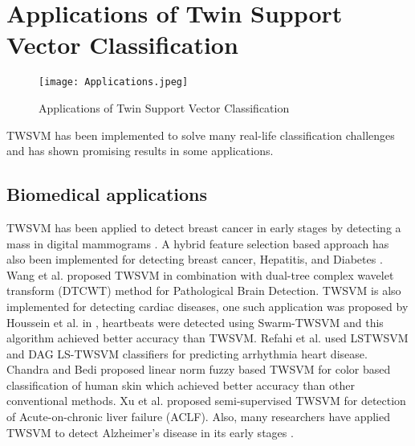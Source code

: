 \documentclass[pdflatex,sn-mathphys]{sn-jnl}%
\theoremstyle{thmstyleone}%
\theoremstyle{thmstyletwo}%
\theoremstyle{thmstylethree}%
\begin{document}
\section{Applications of Twin Support Vector Classification}
\label{sec:Applications of Twin Support Vector Classification}
\begin{figure}
    \centering
    \texttt{[image: Applications.jpeg]}
    \caption{Applications of Twin Support Vector Classification}
    \label{fig:Applications of Twin Support Vector Classification}
\end{figure}
TWSVM has been implemented to solve many real-life classification challenges and has shown promising results in some  applications. 


\subsection{Biomedical applications}
TWSVM has been applied to detect breast cancer in early stages by detecting a mass in digital mammograms \cite{si2009mass}. A hybrid feature selection based approach has also been implemented for detecting breast cancer, Hepatitis, and Diabetes \cite{tomar2015hybrid}. 
Wang et al. \cite{wang2016dual} proposed TWSVM in combination with dual-tree complex wavelet transform (DTCWT) method for Pathological Brain Detection. 
TWSVM is also implemented for detecting cardiac diseases, one such application was proposed by Houssein et al. in \cite{houssein2018improving}, heartbeats were detected using Swarm-TWSVM and this algorithm achieved better accuracy than TWSVM. Refahi et al. \cite{refahi2018ecg} used LSTWSVM and DAG LS-TWSVM classifiers for predicting arrhythmia heart disease. Chandra and Bedi \cite{chandra2018twin} proposed linear norm fuzzy based TWSVM for color based classification of human skin which achieved better accuracy than other conventional methods. Xu et al. \cite{xu2015imbalanced} proposed semi-supervised TWSVM for detection of Acute-on-chronic liver failure (ACLF).
Also, many researchers have applied TWSVM to detect Alzheimer's disease in its early stages \cite{tanveer2019ADreview,zhang2015detection,wang2016detection,alam2017twin,tomar2014feature,wang2016dual,tomar2014efficient,wang2016morphological,tomar2014emotion,wang2015pathological}.
\end{document}
